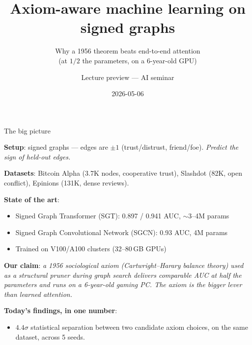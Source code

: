 \documentclass[10pt,aspectratio=169]{beamer}
\title[Axiom-aware ML on signed graphs]{Axiom-aware machine learning on signed graphs}
\subtitle{Why a 1956 theorem beats end-to-end attention\\(at $1/2$ the parameters, on a 6-year-old GPU)}
\author{Lecture preview --- AI seminar}
\date{2026-05-06}
\begin{document}
\begin{frame}
\titlepage
\end{frame}

\begin{frame}{The big picture}

\textbf{Setup}: signed graphs --- edges are $\pm 1$ (trust/distrust,
friend/foe). \emph{Predict the sign of held-out edges.}

\medskip
\textbf{Datasets}: Bitcoin Alpha (3.7K nodes, cooperative trust),
Slashdot (82K, open conflict), Epinions (131K, dense reviews).

\medskip
\textbf{State of the art}:
\begin{itemize}
\item Signed Graph Transformer (SGT): 0.897 / 0.941 AUC, $\sim$3--4M params
\item Signed Graph Convolutional Network (SGCN): 0.93 AUC, 4M params
\item Trained on V100/A100 clusters (32--80\,GB GPUs)
\end{itemize}

\medskip
\textbf{Our claim}: \emph{a 1956 sociological axiom (Cartwright--Harary
balance theory) used as a structural pruner during graph search
delivers comparable AUC at half the parameters and runs on a
6-year-old gaming PC. The axiom is the bigger lever than learned
attention.}

\medskip
\textbf{Today's findings, in one number}:
\begin{itemize}
\item[$\rightarrow$] $4.4\sigma$ statistical separation between two
      candidate axiom choices, on the same dataset, across 5 seeds.
\end{itemize}
\end{frame}
\end{document}
